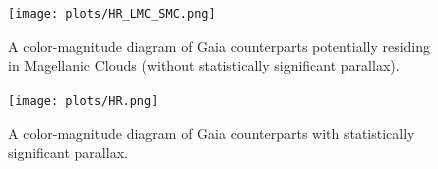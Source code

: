 \documentclass{pracalicmgr}
\begin{document}
\begin{figure}[H]
    \begin{center}
        \texttt{[image: plots/HR\_LMC\_SMC.png]}
    \end{center}
    \caption{A color-magnitude diagram of Gaia counterparts potentially residing in Magellanic Clouds (without statistically significant parallax).}
    \label{HR_SMC}
\end{figure}


\begin{figure}[H]
    \begin{center}
        \texttt{[image: plots/HR.png]}
    \end{center}
    \caption{A color-magnitude diagram of Gaia counterparts with statistically significant parallax.}
    \label{HR_galactic}
\end{figure}
\end{document}
